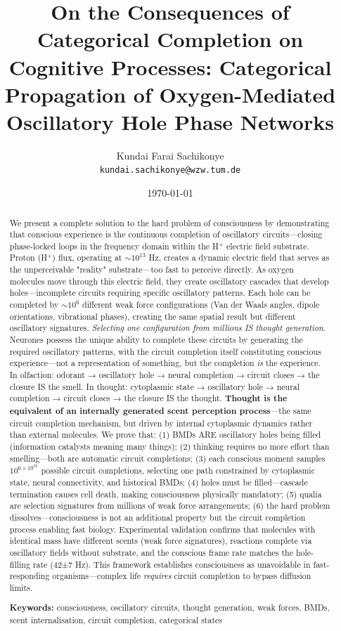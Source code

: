 \documentclass[11pt,a4paper]{article}
\title{\textbf{On the Consequences of Categorical Completion on Cognitive Processes: Categorical Propagation of  Oxygen-Mediated Oscillatory Hole Phase Networks}}
\author{
Kundai Farai Sachikonye\\
\texttt{kundai.sachikonye@wzw.tum.de}
}
\date{\today}
\begin{document}
\maketitle

\begin{abstract}
We present a complete solution to the hard problem of consciousness by demonstrating that conscious experience is the continuous completion of oscillatory circuits—closing phase-locked loops in the frequency domain within the H$^+$ electric field substrate. Proton (H$^+$) flux, operating at $\sim 10^{13}$ Hz, creates a dynamic electric field that serves as the unperceivable "reality" substrate—too fast to perceive directly. As oxygen molecules move through this electric field, they create oscillatory cascades that develop holes—incomplete circuits requiring specific oscillatory patterns. Each hole can be completed by $\sim 10^6$ different weak force configurations (Van der Waals angles, dipole orientations, vibrational phases), creating the same spatial result but different oscillatory signatures. \textit{Selecting one configuration from millions IS thought generation}. Neurones possess the unique ability to complete these circuits by generating the required oscillatory patterns, with the circuit completion itself constituting conscious experience—not a representation of something, but the completion \textit{is} the experience. In olfaction: odorant → oscillatory hole → neural completion → circuit closes → the closure IS the smell. In thought: cytoplasmic state → oscillatory hole → neural completion → circuit closes → the closure IS the thought. \textbf{Thought is the equivalent of an internally generated scent perception process}—the same circuit completion mechanism, but driven by internal cytoplasmic dynamics rather than external molecules. We prove that: (1) BMDs ARE oscillatory holes being filled (information catalysts meaning many things); (2) thinking requires no more effort than smelling—both are automatic circuit completions; (3) each conscious moment samples $10^{6 \times 10^{35}}$ possible circuit completions, selecting one path constrained by cytoplasmic state, neural connectivity, and historical BMDs; (4) holes must be filled—cascade termination causes cell death, making consciousness physically mandatory; (5) qualia are selection signatures from millions of weak force arrangements; (6) the hard problem dissolves—consciousness is not an additional property but the circuit completion process enabling fast biology. Experimental validation confirms that molecules with identical mass have different scents (weak force signatures), reactions complete via oscillatory fields without substrate, and the conscious frame rate matches the hole-filling rate (42±7 Hz). This framework establishes consciousness as unavoidable in fast-responding organisms—complex life \textit{requires} circuit completion to bypass diffusion limits.

\textbf{Keywords:} consciousness, oscillatory circuits, thought generation, weak forces, BMDs, scent internalisation, circuit completion, categorical states
\end{abstract}
\end{document}
